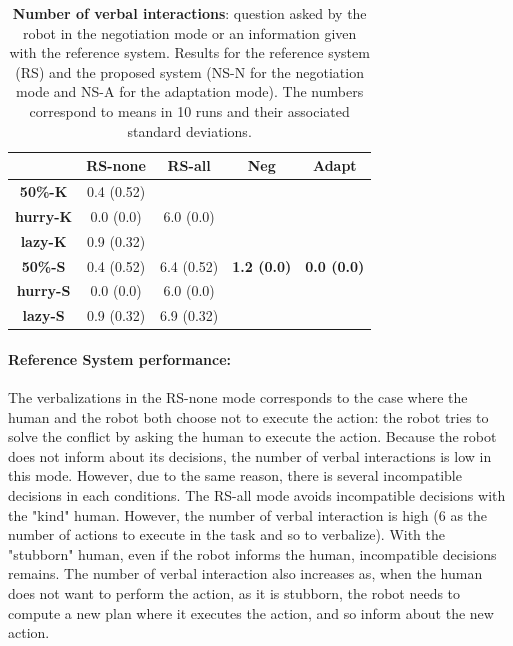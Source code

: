 \documentclass[english,a4paper,11pt,twoside]{StyleThese}
\begin{document}
\begin{table}[!h]
\centering
  \begin{tabular}{|c||c|c|c|c|}
  \hline
     & \textbf{RS-none} & \textbf{RS-all} & \textbf{Neg} & \textbf{Adapt} \\
  \hline
  \hline
     \textbf{50\%-K} & 0.4 (0.52) &  &  &  \\
  \cline{1-2}
     \textbf{hurry-K} & 0.0 (0.0) & 6.0 (0.0) & &  \\
  \cline{1-2}
     \textbf{lazy-K} & 0.9 (0.32) &  &  &  \\
  \cline{1-3}
     \textbf{50\%-S} & 0.4 (0.52) & 6.4 (0.52) &\textbf{ 1.2 (0.0)} & \textbf{0.0 (0.0)} \\
  \cline{1-3}
     \textbf{hurry-S} & 0.0 (0.0) & 6.0 (0.0) &  & \\
  \cline{1-3}
     \textbf{lazy-S} & 0.9 (0.32) & 6.9 (0.32) & & \\
  \hline
  \end{tabular}
   \caption{\textbf{Number of verbal interactions}: question asked by the robot in the negotiation mode or an information given with the reference system. Results for the reference system (RS) and the proposed system (NS-N for the negotiation mode and NS-A for the adaptation mode). The numbers correspond to means in 10 runs and their associated standard deviations.}
   \label{tab:verb}
\end{table}


\paragraph{Reference System performance:} 
The verbalizations in the RS-none mode corresponds to the case where the human and the robot both choose not to execute the action: the robot tries to solve the conflict by asking the human to execute the action. Because the robot does not inform about its decisions, the number of verbal interactions is low in this mode. However, due to the same reason, there is several incompatible decisions in each conditions. The RS-all mode avoids incompatible decisions with the "kind" human. However, the number of verbal interaction is high (6 as the number of actions to execute in the task and so to verbalize). With the "stubborn" human, even if the robot informs the human, incompatible decisions remains. The number of verbal interaction also increases as, when the human does not want to perform the action, as it is stubborn, the robot needs to compute a new plan where it executes the action, and so inform about the new action.
\end{document}
